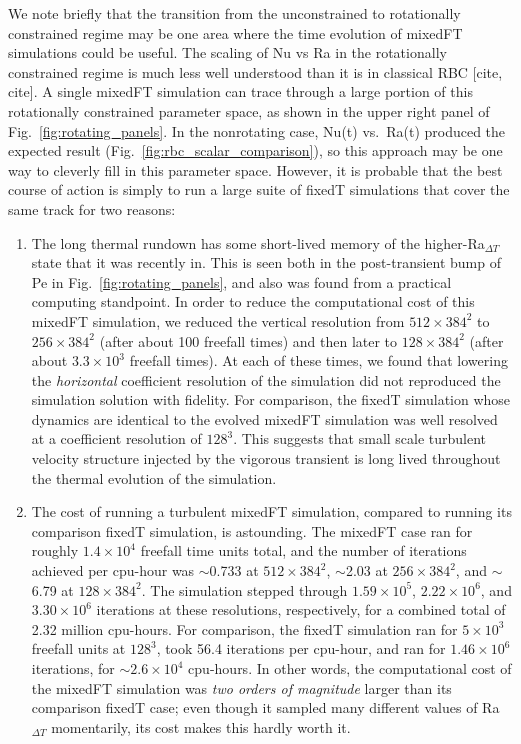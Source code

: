 \documentclass[aps, pre, onecolumn, nofootinbib, notitlepage, groupedaddress, amsfonts, amssymb, amsmath, longbibliography]{revtex4-1}
\begin{document}
We note briefly that the transition from the unconstrained to rotationally constrained regime may be one area where the time evolution of mixedFT simulations could be useful.
The scaling of Nu vs Ra in the rotationally constrained regime is much less well understood than it is in classical RBC [cite, cite].
A single mixedFT simulation can trace through a large portion of this rotationally constrained parameter space, as shown in the upper right panel of Fig.~\ref{fig:rotating_panels}.
In the nonrotating case, Nu(t) vs.~Ra(t) produced the expected result (Fig.~\ref{fig:rbc_scalar_comparison}), so this approach may be one way to cleverly fill in this parameter space.
However, it is probable that the best course of action is simply to run a large suite of fixedT simulations that cover the same track for two reasons:
\begin{enumerate}
\item The long thermal rundown has some short-lived memory of the higher-Ra$_{\Delta T}$ state that it was recently in.
This is seen both in the post-transient bump of Pe in Fig.~\ref{fig:rotating_panels}, and also was found from a practical computing standpoint.
In order to reduce the computational cost of this mixedFT simulation, we reduced the vertical resolution from $512\times384^2$ to $256\times384^2$ (after about 100 freefall times) and then later to $128\times384^2$ (after about $3.3 \times 10^3$ freefall times).
At each of these times, we found that lowering the \emph{horizontal} coefficient resolution of the simulation did not reproduced the simulation solution with fidelity.
For comparison, the fixedT simulation whose dynamics are identical to the evolved mixedFT simulation was well resolved at a coefficient resolution of $128^3$.
This suggests that small scale turbulent velocity structure injected by the vigorous transient is long lived throughout the thermal evolution of the simulation.
\item The cost of running a turbulent mixedFT simulation, compared to running its comparison fixedT simulation, is astounding.
The mixedFT case ran for roughly $1.4 \times 10^4$ freefall time units total, and the number of iterations achieved per cpu-hour was $\sim$0.733 at $512\times384^2$, $\sim$2.03 at $256\times384^2$, and $\sim$6.79 at $128\times384^2$.
The simulation stepped through $1.59 \times 10^5$, $2.22 \times 10^6$, and $3.30 \times 10^6$ iterations at these resolutions, respectively, for a combined total of 2.32 million cpu-hours.
For comparison, the fixedT simulation ran for $5 \times 10^3$ freefall units at $128^3$, took 56.4 iterations per cpu-hour, and ran for $1.46 \times 10^6$ iterations, for $\sim 2.6 \times 10^4$ cpu-hours.
In other words, the computational cost of the mixedFT simulation was \emph{two orders of magnitude} larger than its comparison fixedT case; even though it sampled many different values of Ra$_{\Delta T}$ momentarily, its cost makes this hardly worth it.
\end{enumerate}
\end{document}
